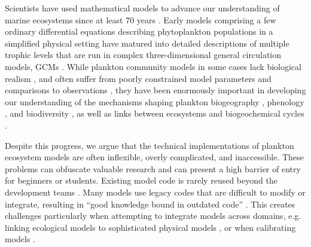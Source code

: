 \documentclass[journal abbreviation, manuscript]{copernicus}
\begin{document}
Scientists have used mathematical models to advance our understanding of marine ecosystems since at least 70 years \citep{Sverdrup1953OnPhytoplankton, Fasham1990a, Gentleman2002a, Follows2007EmergentOcean, Acevedo-Trejos2016}. Early models comprising a few ordinary differential equations describing phytoplankton populations in a simplified physical setting \citep{Evans1985ACycles, Fasham1990a} have matured into detailed descriptions of multiple trophic levels that are run in complex three-dimensional general circulation models, GCMs \citep[e.g.][]{Dutkiewicz2020DimensionsDiversity}. While plankton community models in some cases lack biological realism \citep{Smith2014}, and often suffer from poorly constrained model parameters and comparisons to observations \citep{Anderson2005}, they have been enormously important in developing our understanding of the mechanisms shaping plankton biogeography \citep[e.g.][]{Follows2007EmergentOcean}, phenology \citep[e.g.][]{Taylor1993SeasonalNitrogen}, and biodiversity \citep[e.g.][]{Barton2010b, Acevedo-Trejos2015c}, as well as links between ecosystems and biogeochemical cycles \citep[e.g.][]{Fasham1990a, Sarmiento1998SimulatedWarming, Merico2006IsSystem, Dutkiewicz2009}.

Despite this progress, we argue that the technical implementations of plankton ecosystem models are often inflexible, overly complicated, and inaccessible. These problems can obfuscate valuable research and can present a high barrier of entry for beginners or students. Existing model code is rarely reused beyond the development teams \citep{Belete2017AnTesting}. Many models use legacy codes that are difficult to modify or integrate, resulting in “good knowledge bound in outdated code” \citep{Argent2004AnSemantics}. This creates challenges particularly when attempting to integrate models across domains, e.g. linking ecological models to sophisticated physical models \citep{Koralewski2019CouplingModels}, or when calibrating models \citep{Steenbeek2021MakingPerspective}. 
\end{document}
